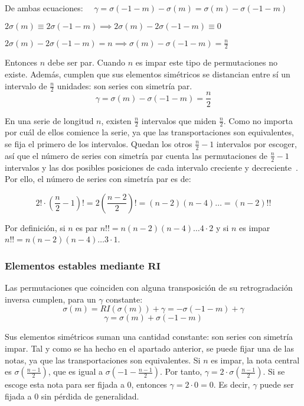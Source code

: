 		De ambas ecuaciones: $\quad\gamma=\sigma(-1-m)-\sigma(m)=\sigma(m)-\sigma(-1-m)$
		
		$2\sigma(m)\equiv2\sigma(-1-m)\implies2\sigma(m)-2\sigma(-1-m)\equiv0$
		
		$2\sigma(m)-2\sigma(-1-m)=n \implies \sigma(m)-\sigma(-1-m)=\frac{n}{2}$
		
		Entonces $n$ debe ser par. Cuando $n$ es impar este tipo de permutaciones no existe. Adem\'as, cumplen que sus elementos sim\'etricos se distancian entre s\'i un intervalo de $\frac{n}{2}$ unidades: son series con simetr\'ia par.
		\[\gamma=\sigma(m)-\sigma(-1-m)=\frac{n}{2}\]
		
		En una serie de longitud $n$, existen $\frac{n}{2}$ intervalos que miden $\frac{n}{2}$. Como no importa por cu\'al de ellos comience la serie, ya que las transportaciones son equivalentes, se fija el primero de los intervalos. Quedan los otros $\frac{n}{2}-1$ intervalos por escoger, as\'i que el n\'umero de series con simetr\'ia par cuenta las permutaciones de $\frac{n}{2}-1$ intervalos y las dos posibles posiciones de cada intervalo \textemdash creciente y decreciente~\cite{reiner}\textemdash. Por ello, el n\'umero de series con simetr\'ia par es de:
		
		\[2! \cdot \left(\frac{n}{2}-1\right)! = 2\left(\frac{n-2}{2}\right)!=(n-2)(n-4)\ldots=(n-2)!!\]
		
		Por definici\'on, si $n$ es par $n!!=n(n-2)(n-4)\ldots4\cdot2$ y si $n$ es impar $n!!=n(n-2)(n-4)\ldots3\cdot1$.

	\subsubsection[Elementos estables mediante $RI$]{Elementos estables mediante $\bm{RI}$}
		Las permutaciones que coinciden con alguna transposici\'on de su retrogradaci\'on inversa cumplen, para un $\gamma$ constante:
		\[\sigma(m)={RI}(\sigma(m))+\gamma=-\sigma(-1-m)+\gamma\]
		\[\gamma=\sigma(m)+\sigma(-1-m)\]
		
		Sus elementos sim\'etricos suman una cantidad constante: son series con simetr\'ia impar. Tal y como se ha hecho en el apartado anterior, se puede fijar una de las notas, ya que las transportaciones son equivalentes. Si $n$ es impar, la nota central es $\sigma(\frac{n-1}{2})$, que es igual a $\sigma(-1-\frac{n-1}{2})$. Por tanto, $\gamma=2\cdot\sigma(\frac{n-1}{2})$. Si se escoge esta nota para ser fijada a 0, entonces $\gamma=2\cdot0=0$. Es decir, $\gamma$ puede ser fijada a 0 sin p\'erdida de generalidad.
		
